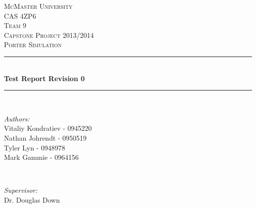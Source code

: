 \documentclass[paper=letter, fontsize=10pt]{scrartcl}
\numberwithin{equation}{section}		%
\numberwithin{figure}{section}			%
\numberwithin{table}{section}				%
\begin{document}
\begin{titlepage}

\newcommand{\HRule}{\rule{\linewidth}{0.5mm}} %
\newcommand{\authors}{\shortstack{Vitaliy Kondratiev,\\Nathan Johrendt,\\Tyler Lyn,\\Mark Gammie}}

\begin{center}
 

\textsc{\LARGE McMaster University}\\[1.5cm] %
\textsc{\Large CAS 4ZP6}\\[0.5cm]
\textsc{\Large Team 9} \\[0.5cm]
\textsc{\Large Capstone Project 2013/2014}\\[0.5cm] %
\textsc{\large Porter Simulation}\\[0.5cm] %


\HRule \\[0.4cm]
{ \huge \bfseries Test Report Revision 0}\\[0.4cm] %
\HRule \\[1.5cm]
 

\begin{minipage}{0.4\textwidth}
\begin{flushleft} \large
\emph{Authors:}\\
Vitaliy Kondratiev - 0945220\\
Nathan Johrendt - 0950519\\
Tyler Lyn - 0948978\\
Mark Gammie - 0964156
\end{flushleft}
\end{minipage}
~
\begin{minipage}{0.4\textwidth}
\begin{flushright} \large
\emph{Supervisor:} \\
Dr. Douglas Down %
\end{flushright}
\end{minipage}\\[4cm]


\end{center}
\end{titlepage}
\end{document}
